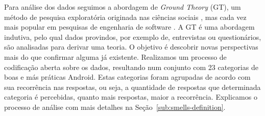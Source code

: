 Para análise dos dados seguimos a abordagem de \textit{Ground Theory} (GT), um método de pesquisa exploratória originada nas ciências sociais \cite{Strauss2007, GlaserStrauss1999}, mas cada vez mais popular em pesquisas de engenharia de software \cite{Adolph2011}. A GT é uma abordagem indutiva, pelo qual dados provindos, por exemplo de, entrevistas ou questionários, são analisadas para derivar uma teoria. O objetivo é descobrir novas perspectivas mais do que confirmar alguma já existente.
Realizamos um processo de codificação aberta sobre os dados, resultando num conjunto com 23 categorias de boas e más práticas Android. Estas categorias foram agrupadas de acordo com sua recorrência nas respostas, ou seja, a quantidade de respostas que determinada categoria é percebidas, quanto mais respostas, maior a recorrência.
Explicamos o processo de análise com mais detalhes na Seção~\ref{sub:smells-definition}.






